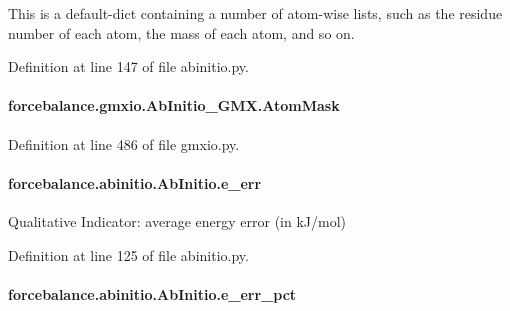 This is a default-\/dict containing a number of atom-\/wise lists, such as the residue number of each atom, the mass of each atom, and so on. 



Definition at line 147 of file abinitio.\-py.

\hypertarget{classforcebalance_1_1gmxio_1_1AbInitio__GMX_a1ba04a104c0a2e1bafdf3281c95bac72}{
\paragraph[{Atom\-Mask}]{\setlength{\rightskip}{0pt plus 5cm}forcebalance.\-gmxio.\-Ab\-Initio\-\_\-\-G\-M\-X.\-Atom\-Mask}}\label{classforcebalance_1_1gmxio_1_1AbInitio__GMX_a1ba04a104c0a2e1bafdf3281c95bac72}


Definition at line 486 of file gmxio.\-py.

\hypertarget{classforcebalance_1_1abinitio_1_1AbInitio_aa569290969858e189935b3de37ead3f0}{
\paragraph[{e\-\_\-err}]{\setlength{\rightskip}{0pt plus 5cm}forcebalance.\-abinitio.\-Ab\-Initio.\-e\-\_\-err\hspace{0.3cm}{\ttfamily [inherited]}}}\label{classforcebalance_1_1abinitio_1_1AbInitio_aa569290969858e189935b3de37ead3f0}


Qualitative Indicator\-: average energy error (in k\-J/mol) 



Definition at line 125 of file abinitio.\-py.

\hypertarget{classforcebalance_1_1abinitio_1_1AbInitio_a4e3e525a03ab55bc004ebf0e3a0d60ce}{
\paragraph[{e\-\_\-err\-\_\-pct}]{\setlength{\rightskip}{0pt plus 5cm}forcebalance.\-abinitio.\-Ab\-Initio.\-e\-\_\-err\-\_\-pct\hspace{0.3cm}{\ttfamily [inherited]}}}\label{classforcebalance_1_1abinitio_1_1AbInitio_a4e3e525a03ab55bc004ebf0e3a0d60ce}



